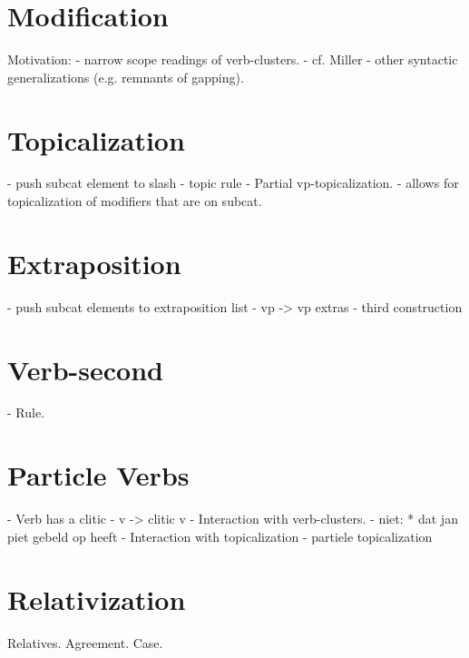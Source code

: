 \section{Modification}
Motivation: 
- narrow scope readings of verb-clusters.
- cf. Miller
- other syntactic generalizations (e.g. remnants of gapping).

\section{Topicalization}
- push subcat element to slash
- topic rule
- Partial vp-topicalization.
- allows for topicalization of modifiers that are on subcat.

\section{Extraposition}
- push subcat elements to extraposition list
- vp -> vp extras
- third construction

\section{Verb-second}
- Rule.

\section{Particle Verbs}
- Verb has a clitic
- v -> clitic v 
- Interaction with verb-clusters. 
  - niet: * dat jan piet gebeld op heeft
- Interaction with topicalization
  - partiele topicalization


\section{Relativization}
Relatives. Agreement. Case.
















